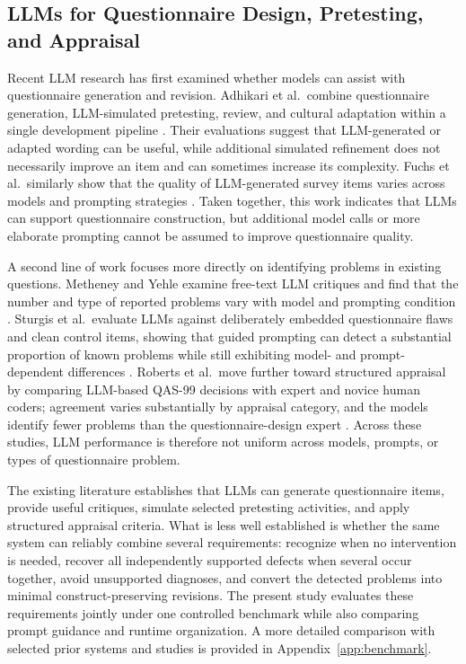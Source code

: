 \documentclass[11pt,a4paper]{article}
\begin{document}
\subsection{LLMs for Questionnaire Design, Pretesting, and Appraisal}
\label{subsec:llm-questionnaires}

Recent LLM research has first examined whether models can assist with questionnaire
generation and revision. Adhikari et al.\ combine questionnaire generation,
LLM-simulated pretesting, review, and cultural adaptation within a single development
pipeline \cite{adhikari2025exploring}. Their evaluations suggest that LLM-generated
or adapted wording can be useful, while additional simulated refinement does not
necessarily improve an item and can sometimes increase its complexity. Fuchs et al.\
similarly show that the quality of LLM-generated survey items varies across models
and prompting strategies \cite{fuchs2026ai}. Taken together, this work indicates
that LLMs can support questionnaire construction, but additional model calls or more
elaborate prompting cannot be assumed to improve questionnaire quality.

A second line of work focuses more directly on identifying problems in existing
questions. Metheney and Yehle examine free-text LLM critiques and find that the
number and type of reported problems vary with model and prompting condition
\cite{metheney2025generative}. Sturgis et al.\ evaluate LLMs against deliberately
embedded questionnaire flaws and clean control items, showing that guided prompting
can detect a substantial proportion of known problems while still exhibiting
model- and prompt-dependent differences \cite{sturgis2026llms}. Roberts et al.\
move further toward structured appraisal by comparing LLM-based QAS-99 decisions
with expert and novice human coders; agreement varies substantially by appraisal
category, and the models identify fewer problems than the questionnaire-design
expert \cite{roberts2026survey}. Across these studies, LLM performance is therefore
not uniform across models, prompts, or types of questionnaire problem.

The existing literature establishes that LLMs can generate questionnaire items,
provide useful critiques, simulate selected pretesting activities, and apply
structured appraisal criteria. What is less well established is whether the same
system can reliably combine several requirements: recognize when no intervention is
needed, recover all independently supported defects when several occur together,
avoid unsupported diagnoses, and convert the detected problems into minimal
construct-preserving revisions. The present study evaluates these requirements
jointly under one controlled benchmark while also comparing prompt guidance and
runtime organization. A more detailed comparison with selected prior systems and
studies is provided in Appendix~\ref{app:benchmark}.
\end{document}
